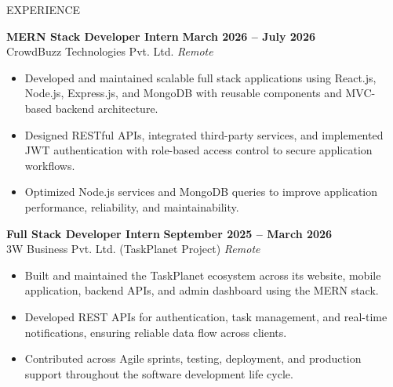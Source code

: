 \documentclass{resume}
\begin{document}
\begin{rSection}{EXPERIENCE}

\textbf{MERN Stack Developer Intern} \hfill \textbf{March 2026 -- July 2026} \\
CrowdBuzz Technologies Pvt. Ltd. \hfill \textit{Remote}

\begin{itemize}[left=0em,label=\textbullet,itemsep=-0.55em]
\item Developed and maintained scalable full stack applications using React.js, Node.js, Express.js, and MongoDB with reusable components and MVC-based backend architecture.
\item Designed RESTful APIs, integrated third-party services, and implemented JWT authentication with role-based access control to secure application workflows.
\item Optimized Node.js services and MongoDB queries to improve application performance, reliability, and maintainability.
\end{itemize}

\smallskip

\textbf{Full Stack Developer Intern} \hfill \textbf{September 2025 -- March 2026} \\
3W Business Pvt. Ltd. (TaskPlanet Project) \hfill \textit{Remote}

\begin{itemize}[left=0em,label=\textbullet,itemsep=-0.55em]
\item Built and maintained the TaskPlanet ecosystem across its website, mobile application, backend APIs, and admin dashboard using the MERN stack.
\item Developed REST APIs for authentication, task management, and real-time notifications, ensuring reliable data flow across clients.
\item Contributed across Agile sprints, testing, deployment, and production support throughout the software development life cycle.
\end{itemize}

\end{rSection}

\end{document}
